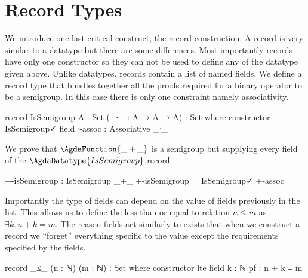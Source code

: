 \documentclass[./Thesis.tex]{subfiles}
\begin{document}
\section{Record Types}
\label{sec:record-types}
We introduce one last critical construct, the record construction. A record is
very similar to a datatype but there are some differences. Most importantly
records have only one constructor so they can not be used to define any of the
datatype given above. Unlike datatypes, records contain a list of named fields.
We define a record type that bundles together all the proofs required for a
binary operator to be a semigroup. In this case there is only one constraint
namely associativity. \\
\begin{code}
    record IsSemigroup {A : Set} (_∙_ : A → A → A) : Set where
      constructor IsSemigroup✓
      field
        ∙-assoc : Associative _∙_
\end{code}
We prove that $\AgdaFunction{\_+\_}$ is a semigroup but supplying every
field of the $\AgdaDatatype{IsSemigroup}$ record.
\begin{code}
    +-isSemigroup : IsSemigroup _+_
    +-isSemigroup = IsSemigroup✓ +-assoc
\end{code}
Importantly the type of fields can depend on the value of fields previously in
the list. This allows us to define the less than or equal to relation $n \leq m$
as $\exists k. \, n + k = m$. The reason fields act similarly to exists
that when we construct a record we ``forget'' everything specific to the value
except the requirements specified by the fields.
\begin{code}
    record _≤_ (n : ℕ) (m : ℕ) : Set where
      constructor lte
      field
        k : ℕ
        pf : n + k ≡ m
\end{code}



\end{document}
